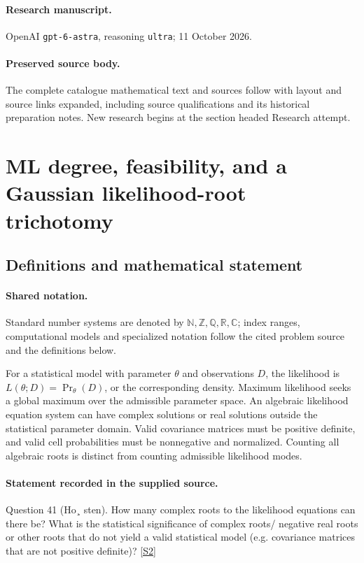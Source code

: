 \documentclass[11pt]{article}
\begin{document}
\paragraph{Research manuscript.} OpenAI \texttt{gpt-6-astra}, reasoning \texttt{ultra}; 11 October 2026.
\paragraph{Preserved source body.} The complete catalogue mathematical text and sources follow with layout and source links expanded, including source qualifications and its historical preparation notes. New research begins at the section headed Research attempt.

\section{ML degree, feasibility, and a Gaussian likelihood-root trichotomy}\label{statement}

\subsection{Definitions and mathematical statement}

\paragraph{Shared notation.}Standard number systems are denoted by $\mathbb N,\mathbb Z,\mathbb Q,\mathbb R,\mathbb C$; index ranges, computational models and specialized notation follow the cited problem source and the definitions below.


For a statistical model with parameter $\theta$ and observations $D$, the likelihood is $L(\theta;D)=\Pr_\theta(D)$, or the corresponding density. Maximum likelihood seeks a global maximum over the admissible parameter space. An algebraic likelihood equation system can have complex solutions or real solutions outside the statistical parameter domain. Valid covariance matrices must be positive definite, and valid cell probabilities must be nonnegative and normalized. Counting all algebraic roots is distinct from counting admissible likelihood modes.
\paragraph{Statement recorded in the supplied source.}
Question 41 (Ho¸ sten). How many complex roots to the likelihood equations can there be? What is the statistical significance of complex roots/ negative real roots or other roots that do not yield a valid statistical model (e.g. covariance matrices that are not positive definite)? \href{https://aimath.org/WWN/compalgstat/compalgstat.pdf}{[S2]}
\end{document}
